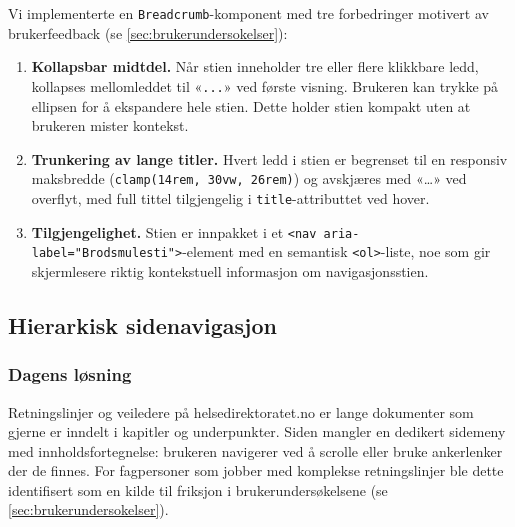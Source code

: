 Vi implementerte en \texttt{Breadcrumb}-komponent med tre forbedringer
motivert av brukerfeedback (se \autoref{sec:brukerundersokelser}):

\begin{enumerate}
    \item \textbf{Kollapsbar midtdel.} Når stien inneholder tre eller
          flere klikkbare ledd, kollapses mellomleddet til «\texttt{...}»
          ved første visning. Brukeren kan trykke på ellipsen for å
          ekspandere hele stien. Dette holder stien kompakt uten at
          brukeren mister kontekst.

    \item \textbf{Trunkering av lange titler.} Hvert ledd i stien er
          begrenset til en responsiv maksbredde
          (\texttt{clamp(14rem,\,30vw,\,26rem)}) og avskjæres med «…»
          ved overflyt, med full tittel tilgjengelig i
          \texttt{title}-attributtet ved hover.

    \item \textbf{Tilgjengelighet.} Stien er innpakket i et
          \texttt{<nav aria-label="Brodsmulesti">}-element med en
          semantisk \texttt{<ol>}-liste, noe som gir skjermlesere riktig
          kontekstuell informasjon om navigasjonsstien.
\end{enumerate}

\subsection{Hierarkisk sidenavigasjon}
\label{sec:sidenavigasjon}

\subsubsection{Dagens løsning}
\label{sec:sidenavigasjon-idag}


Retningslinjer og veiledere på helsedirektoratet.no er lange dokumenter
som gjerne er inndelt i kapitler og underpunkter. Siden mangler en
dedikert sidemeny med innholdsfortegnelse: brukeren navigerer ved å
scrolle eller bruke ankerlenker der de finnes. For fagpersoner som jobber
med komplekse retningslinjer ble dette identifisert som en kilde til
friksjon i brukerundersøkelsene (se \autoref{sec:brukerundersokelser}).

